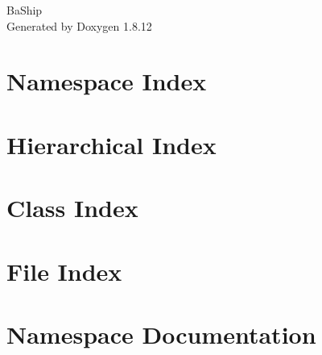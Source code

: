 \documentclass[twoside]{book}
\newcommand{\+}{\discretionary{\mbox{\scriptsize$\hookleftarrow$}}{}{}}
\newcommand{\clearemptydoublepage}{%
  \newpage{\pagestyle{empty}\cleardoublepage}%
}
\begin{document}
\hypersetup{pageanchor=false,
             bookmarksnumbered=true,
             pdfencoding=unicode
            }
\begin{titlepage}
\vspace*{7cm}
\begin{center}%
{\Large Ba\+Ship }\\
\vspace*{1cm}
{\large Generated by Doxygen 1.8.12}\\
\end{center}
\end{titlepage}
\clearemptydoublepage
{}
\tableofcontents
\clearemptydoublepage
{}
\hypersetup{pageanchor=true}

\chapter{Namespace Index}

\chapter{Hierarchical Index}

\chapter{Class Index}

\chapter{File Index}

\chapter{Namespace Documentation}





















\end{document}
